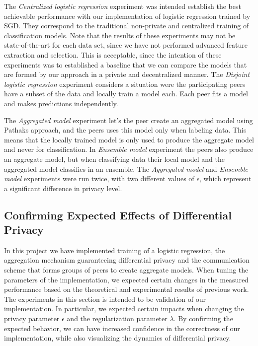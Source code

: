 The \textit{Centralized logistic regression} experiment was intended establish the best achievable performance with our implementation of logistic regression trained by SGD. They correspond to the traditional non-private and centralized training of classification models. Note that the results of these experiments may not be state-of-the-art for each data set, since we have not performed advanced feature extraction and selection. This is acceptable, since the intention of these experiments was to established a baseline that we can compare the models that are formed by our approach in a private and decentralized manner. The \textit{Disjoint logistic regression} experiment considers a situation were the participating peers have a subset of the data and locally train a model each. Each peer fits a model and makes predictions independently.

The \textit{Aggregated model} experiment let's the peer create an aggregated model using Pathaks approach, and the peers uses this model only when labeling data. This means that the locally trained model is only used to produce the aggregate model and never for classification. In \textit{Ensemble model} experiment the peers also produce an aggregate model, but when classifying data their local model and the aggregated model classifies in an ensemble. The \textit{Aggregated model} and \textit{Ensemble model} experiments were run twice, with two different values of $\epsilon$, which represent a significant difference in privacy level.



\subsection{Confirming Expected Effects of Differential Privacy}

In this project we have implemented training of a logistic regression, the aggregation mechanism guaranteeing differential privacy and the communication scheme that forms groups of peers to create aggregate models. When tuning the parameters of the implementation, we expected certain changes in the measured performance based on the theoretical and experimental results of previous work. The experiments in this section is intended to be validation of our implementation. In particular, we expected certain impacts when changing the privacy parameter $\epsilon$ and the regularization parameter $\lambda$. By confirming the expected behavior, we can have increased confidence in the correctness of our implementation, while also visualizing the dynamics of differential privacy.

